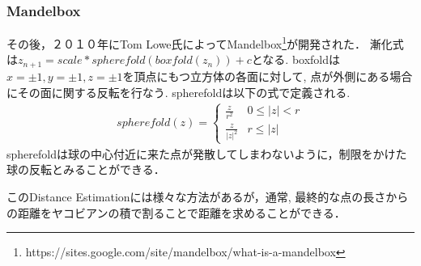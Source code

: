 \subsubsection{Mandelbox}
その後，２０１０年にTom Lowe氏によってMandelbox\footnote{https://sites.google.com/site/mandelbox/what-is-a-mandelbox}が開発された．
漸化式は$z_{n+1} = scale * spherefold(boxfold(z_n)) + c$となる.
boxfoldは$x=\pm1, y=\pm1, z=\pm1$を頂点にもつ立方体の各面に対して, 点が外側にある場合にその面に関する反転を行なう.
spherefoldは以下の式で定義される.
\begin{eqnarray*}
 spherefold(z) = \begin{cases}
                  \frac{z}{r^2} & 0 \le |z| < r \\
                  \frac{z}{|z|^2} & r \le |z|
                 \end{cases}
\end{eqnarray*}
spherefoldは球の中心付近に来た点が発散してしまわないように，制限をかけた球の反転とみることができる．

このDistance Estimationには様々な方法があるが，通常, 最終的な点の長さからの距離をヤコビアンの積で割ることで距離を求めることができる．

